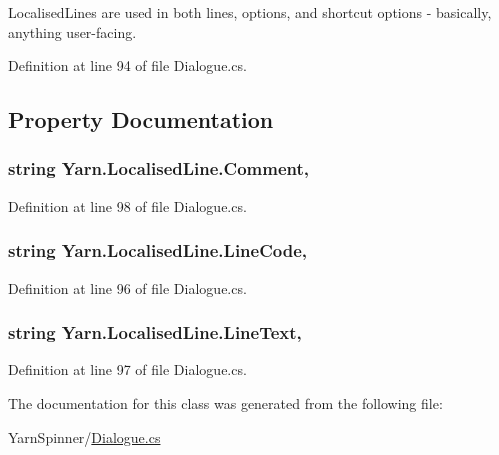 Localised\-Lines are used in both lines, options, and shortcut options -\/ basically, anything user-\/facing. 

Definition at line 94 of file Dialogue.\-cs.



\subsection{Property Documentation}
\hypertarget{a00136_afbfb834bb1623653fa73945c221c4b9d}{
\subsubsection[{Comment}]{\setlength{\rightskip}{0pt plus 5cm}string Yarn.\-Localised\-Line.\-Comment\hspace{0.3cm}{\ttfamily [get]}, {\ttfamily [set]}}}\label{a00136_afbfb834bb1623653fa73945c221c4b9d}


Definition at line 98 of file Dialogue.\-cs.

\hypertarget{a00136_aad88f588cbbe2df9bb83da59eeff3d3c}{
\subsubsection[{Line\-Code}]{\setlength{\rightskip}{0pt plus 5cm}string Yarn.\-Localised\-Line.\-Line\-Code\hspace{0.3cm}{\ttfamily [get]}, {\ttfamily [set]}}}\label{a00136_aad88f588cbbe2df9bb83da59eeff3d3c}


Definition at line 96 of file Dialogue.\-cs.

\hypertarget{a00136_ab0b4fa82cfa7693ff3c96fe5c3837fff}{
\subsubsection[{Line\-Text}]{\setlength{\rightskip}{0pt plus 5cm}string Yarn.\-Localised\-Line.\-Line\-Text\hspace{0.3cm}{\ttfamily [get]}, {\ttfamily [set]}}}\label{a00136_ab0b4fa82cfa7693ff3c96fe5c3837fff}


Definition at line 97 of file Dialogue.\-cs.



The documentation for this class was generated from the following file\-:\begin{DoxyCompactItemize}
\item 
Yarn\-Spinner/\hyperlink{a00308}{Dialogue.\-cs}\end{DoxyCompactItemize}
